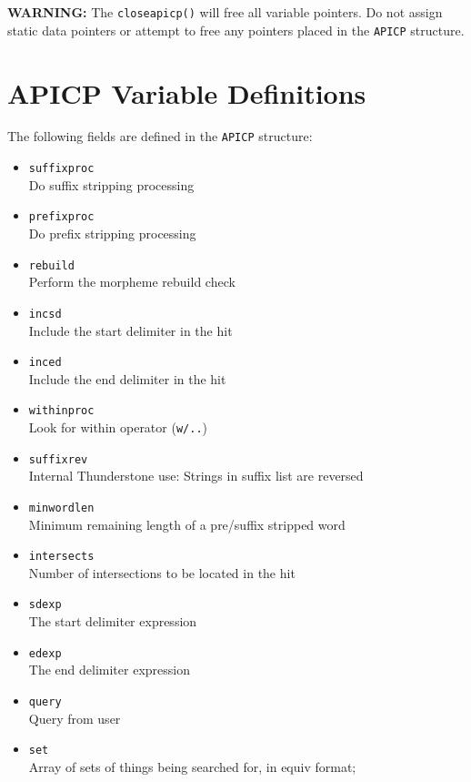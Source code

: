 {\bf WARNING:}  The \verb`closeapicp()` will free all variable pointers.  Do
not assign static data pointers or attempt to free any
pointers placed in the \verb`APICP` structure.

\section{APICP Variable Definitions}

The following fields are defined in the \verb`APICP` structure:

\begin{itemize}
  \item \verb`suffixproc` \\
    Do suffix stripping processing
  \item \verb`prefixproc` \\
    Do prefix stripping processing
  \item \verb`rebuild` \\
    Perform the morpheme rebuild check
  \item \verb`incsd` \\
    Include the start delimiter in the hit
  \item \verb`inced` \\
    Include the end delimiter in the hit
  \item \verb`withinproc` \\
    Look for within operator (\verb`w/..`)
  \item \verb`suffixrev` \\
    Internal Thunderstone use: Strings in suffix list are reversed
  \item \verb`minwordlen` \\
    Minimum remaining length of a pre/suffix stripped word
  \item \verb`intersects` \\
    Number of intersections to be located in the hit
  \item \verb`sdexp` \\
    The start delimiter expression
  \item \verb`edexp` \\
    The end delimiter expression
  \item \verb`query` \\
    Query from user
  \item \verb`set` \\
    Array of sets of things being searched for, in equiv format;

\end{itemize}
